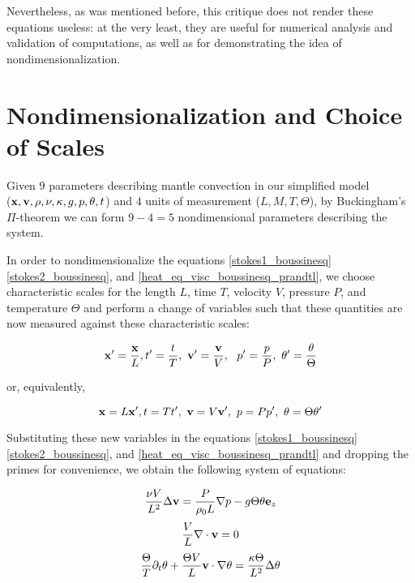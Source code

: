 Nevertheless, as was mentioned before, this critique does not render these equations useless: at the very least, they are useful for numerical analysis and validation of computations, as well as for demonstrating the idea of nondimensionalization.

\section{Nondimensionalization and Choice of Scales}

Given $9$ parameters describing mantle convection in our simplified model \\ ($\mathbf{x}, \mathbf{v}, \rho, \nu, \kappa, g, p, \theta, t$) and $4$ units of measurement ($L, M, T, \Theta$), by Buckingham's $\Pi$-theorem we can form $9 - 4 = 5$ nondimensional parameters describing the system. \cite{barenblatt1} %

In order to nondimensionalize the equations \ref{stokes1_boussinesq} \ref{stokes2_boussinesq}, and \ref{heat_eq_visc_boussinesq_prandtl}, we choose characteristic scales for the length $L$, time $T$, velocity $V$, pressure $P$, and temperature $\Theta$ and perform a change of variables such that these quantities are now measured against these characteristic scales:

$$ \mathbf{x^{\prime}} = \frac{\mathbf{x}}{L}, t^{\prime} = \frac{t}{T},~ \mathbf{v^{\prime}} = \frac{\mathbf{v}}{V},~ ~ p^{\prime} = \frac{p}{P}, ~\theta^{\prime} = \frac{\theta}{\Theta} $$  

or, equivalently,

$$ \mathbf{x} = L \mathbf{x^{\prime}}, t = T t^{\prime},~ \mathbf{v} = V \mathbf{v^{\prime}},~ p = P p^{\prime}, ~ \theta = \Theta \theta^{\prime} $$ 

Substituting these new variables in the equations \ref{stokes1_boussinesq} \ref{stokes2_boussinesq}, and \ref{heat_eq_visc_boussinesq_prandtl} and dropping the primes for convenience, we obtain the following system of equations:

\begin{equation}
\frac{\nu V}{L^2} \Delta\mathbf{v} = \frac{P}{\rho_0 L}\nabla p - g \Theta \theta \mathbf{e}_z
\end{equation}
\begin{equation}
\frac{V}{L} \nabla\cdot \mathbf{v} = 0
\end{equation}
\begin{equation}
\frac{\Theta}{T} \partial_t\theta + \frac{\Theta V}{L} \mathbf{v}\cdot\nabla\theta = \frac{\kappa \Theta}{L^2} \Delta\theta  
\end{equation} 


